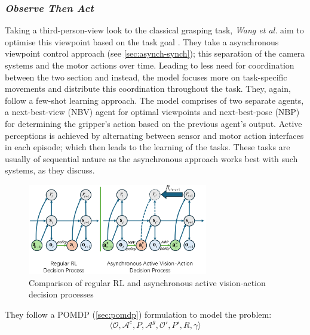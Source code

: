 \subsubsection{\emph{Observe Then Act}}
Taking a third-person-view look to the classical grasping task, \emph{Wang et al.} aim to optimise this viewpoint based on the task goal \cite{wang2024observeactasynchronousactive}. They take a asynchronous viewpoint control approach (see \ref{sec:asynch-synch}); this separation of the camera systems and the motor actions over time. Leading to less need for coordination between the two section and instead, the model focuses more on task-specific movements and distribute this coordination throughout the task. 
They, again, follow a few-shot learning approach. The model comprises of two separate agents, a next-best-view (NBV) agent for optimal viewpoints and next-best-pose (NBP) for determining the gripper's action based on the previous agent's output. Active perceptions is achieved by alternating between sensor and motor action interfaces in each episode; which then leads to the learning of the tasks. These tasks are usually of sequential nature as the asynchronous approach works best with such systems, as they discuss.
\begin{figure}[h]
  \centering
  \includegraphics[width=0.7\textwidth]{assets/rel-work/ota-asynch-policy.png}
  \caption{Comparison of regular RL and asynchronous active vision-action decision processes \cite{wang2024observeactasynchronousactive}}\label{fig:oat-neurons}
\end{figure}

They follow a POMDP (\ref{sec:pomdp}) formulation to model the problem:
\[
  \langle \mathcal{O}, \mathcal{A}^c, P, \mathcal{A}^g, \mathcal{O}', P', R, \gamma \rangle
\]

